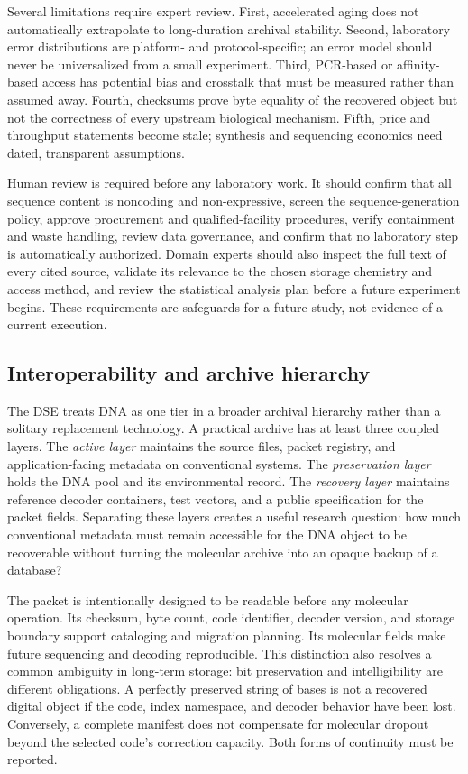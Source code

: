 \documentclass[conference]{IEEEtran}
\begin{document}
Several limitations require expert review. First, accelerated aging does not automatically extrapolate to long-duration archival stability. Second, laboratory error distributions are platform- and protocol-specific; an error model should never be universalized from a small experiment. Third, PCR-based or affinity-based access has potential bias and crosstalk that must be measured rather than assumed away. Fourth, checksums prove byte equality of the recovered object but not the correctness of every upstream biological mechanism. Fifth, price and throughput statements become stale; synthesis and sequencing economics need dated, transparent assumptions.

Human review is required before any laboratory work. It should confirm that all sequence content is noncoding and non-expressive, screen the sequence-generation policy, approve procurement and qualified-facility procedures, verify containment and waste handling, review data governance, and confirm that no laboratory step is automatically authorized. Domain experts should also inspect the full text of every cited source, validate its relevance to the chosen storage chemistry and access method, and review the statistical analysis plan before a future experiment begins. These requirements are safeguards for a future study, not evidence of a current execution.

\subsection{Interoperability and archive hierarchy}

The DSE treats DNA as one tier in a broader archival hierarchy rather than a solitary replacement technology. A practical archive has at least three coupled layers. The \emph{active layer} maintains the source files, packet registry, and application-facing metadata on conventional systems. The \emph{preservation layer} holds the DNA pool and its environmental record. The \emph{recovery layer} maintains reference decoder containers, test vectors, and a public specification for the packet fields. Separating these layers creates a useful research question: how much conventional metadata must remain accessible for the DNA object to be recoverable without turning the molecular archive into an opaque backup of a database?

The packet is intentionally designed to be readable before any molecular operation. Its checksum, byte count, code identifier, decoder version, and storage boundary support cataloging and migration planning. Its molecular fields make future sequencing and decoding reproducible. This distinction also resolves a common ambiguity in long-term storage: bit preservation and intelligibility are different obligations. A perfectly preserved string of bases is not a recovered digital object if the code, index namespace, and decoder behavior have been lost. Conversely, a complete manifest does not compensate for molecular dropout beyond the selected code's correction capacity. Both forms of continuity must be reported.
\end{document}
